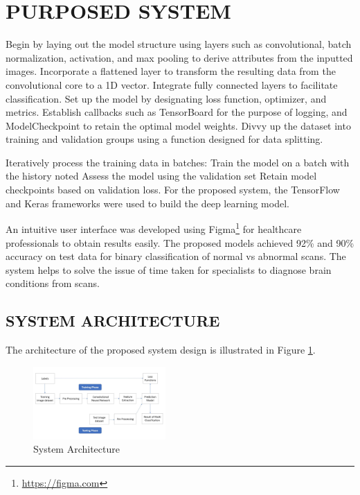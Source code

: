 \documentclass[conference]{IEEEtran}
\begin{document}
\section{ PURPOSED SYSTEM}

Begin by laying out the model structure using layers such as convolutional, batch normalization, activation, and max pooling to derive attributes from the inputted images. Incorporate a flattened layer to transform the resulting data from the convolutional core to a 1D vector.
Integrate fully connected layers to facilitate classification. Set up the model by designating loss function, optimizer, and metrics. Establish callbacks such as TensorBoard for the purpose of logging, and ModelCheckpoint to retain the optimal model weights. Divvy up the dataset into training and validation groups using a function designed for data splitting. 

Iteratively process the training data in batches: Train the model on a batch with the history noted Assess the model using the validation set Retain model checkpoints based on validation loss. For the proposed system, the TensorFlow and Keras frameworks were used to build the deep learning model. 

An intuitive user interface was developed using Figma\footnote{\url{https://figma.com}} for healthcare professionals to obtain results easily. 
The proposed models achieved 92\% and 90\% accuracy on test data for binary classification of normal vs abnormal scans. The system helps to solve the issue of time taken for specialists to diagnose brain conditions from scans. 

\subsection{SYSTEM ARCHITECTURE}

The architecture of the proposed system design is illustrated in Figure \ref{fig:sys_arch}.

\begin{figure}
    \centering
    \includegraphics[width=0.45\textwidth]{figures/9.jpg}
    \caption{System Architecture}
    \label{fig:sys_arch}
\end{figure}
\end{document}
